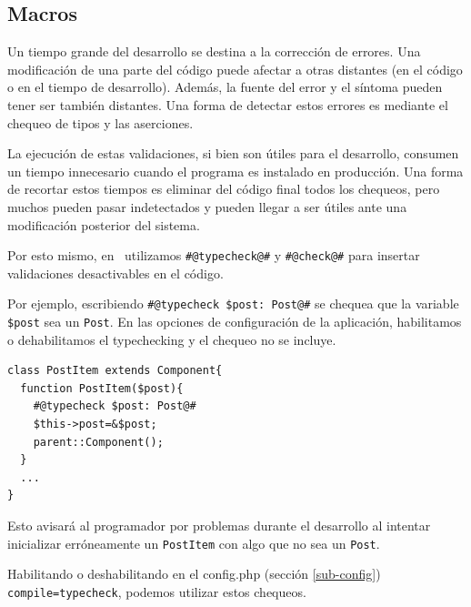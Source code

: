 
\subsection{Macros}
\label{sub-macros}

Un tiempo grande del desarrollo se destina a la corrección de errores. Una modificación de una parte del código puede afectar a otras distantes (en el código o en el tiempo de desarrollo). Además, la fuente del error y el síntoma pueden tener ser también distantes. Una forma de detectar estos errores es mediante el chequeo de tipos y las aserciones.

La ejecución de estas validaciones, si bien son útiles para el desarrollo, consumen un tiempo innecesario cuando el programa es instalado en producción. Una forma de recortar estos tiempos es eliminar del código final todos los chequeos, pero muchos pueden pasar indetectados y pueden llegar a ser útiles ante una modificación posterior del sistema.

Por esto mismo, en \PWB\ utilizamos \verb'#@typecheck@#' y \verb'#@check@#' para insertar validaciones desactivables en el código.

Por ejemplo, escribiendo \verb"#@typecheck $post: Post@#" se chequea que la variable \verb"$post"
sea un \verb'Post'. En las opciones de configuración de la aplicación, habilitamos o dehabilitamos el typechecking y el chequeo no se incluye.

\begin{verbatim}
class PostItem extends Component{
  function PostItem($post){
    #@typecheck $post: Post@#
    $this->post=&$post;
    parent::Component();
  }
  ...
}
\end{verbatim}

Esto avisará al programador por problemas durante el desarrollo al intentar inicializar erróneamente un \verb"PostItem" con algo que no sea un \verb'Post'.

Habilitando o deshabilitando en el config.php (sección \ref{sub-config}) \verb'compile=typecheck', podemos utilizar estos chequeos.

